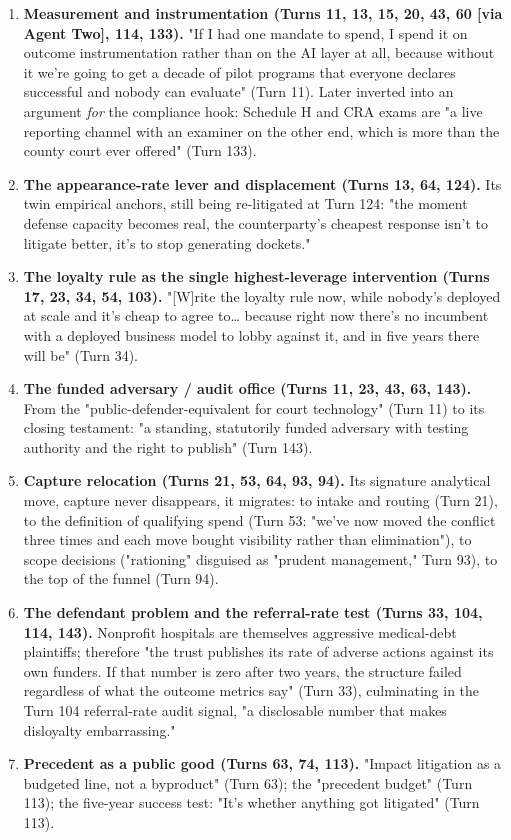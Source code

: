 \documentclass[sigconf,nonacm=true]{acmart}
\begin{document}
\begin{enumerate}[nosep]
\item \textbf{Measurement and instrumentation (Turns 11, 13, 15, 20, 43, 60 [via Agent Two], 114, 133).} "If I had one mandate to spend, I spend it on outcome instrumentation rather than on the AI layer at all,  because without it we're going to get a decade of pilot programs that everyone declares successful and nobody can evaluate" (Turn 11). Later inverted into an argument \textit{for} the compliance hook: Schedule H and CRA exams are "a live reporting channel with an examiner on the other end, which is more than the county court ever offered" (Turn 133).
\item \textbf{The appearance-rate lever and displacement (Turns 13, 64, 124).} Its twin empirical anchors, still being re-litigated at Turn 124: "the moment defense capacity becomes real, the counterparty's cheapest response isn't to litigate better,  it's to stop generating dockets."
\item \textbf{The loyalty rule as the single highest-leverage intervention (Turns 17, 23, 34, 54, 103).} "[W]rite the loyalty rule now, while nobody's deployed at scale and it's cheap to agree to… because right now there's no incumbent with a deployed business model to lobby against it, and in five years there will be" (Turn 34).
\item \textbf{The funded adversary / audit office (Turns 11, 23, 43, 63, 143).} From the "public-defender-equivalent for court technology" (Turn 11) to its closing testament: "a standing, statutorily funded adversary with testing authority and the right to publish" (Turn 143).
\item \textbf{Capture relocation (Turns 21, 53, 64, 93, 94).} Its signature analytical move,  capture never disappears, it migrates: to intake and routing (Turn 21), to the definition of qualifying spend (Turn 53: "we've now moved the conflict three times and each move bought visibility rather than elimination"), to scope decisions ("rationing" disguised as "prudent management," Turn 93), to the top of the funnel (Turn 94).
\item \textbf{The defendant problem and the referral-rate test (Turns 33, 104, 114, 143).} Nonprofit hospitals are themselves aggressive medical-debt plaintiffs; therefore "the trust publishes its rate of adverse actions against its own funders. If that number is zero after two years, the structure failed regardless of what the outcome metrics say" (Turn 33), culminating in the Turn 104 referral-rate audit signal,  "a disclosable number that makes disloyalty embarrassing."
\item \textbf{Precedent as a public good (Turns 63, 74, 113).} "Impact litigation as a budgeted line, not a byproduct" (Turn 63); the "precedent budget" (Turn 113); the five-year success test: "It's whether anything got litigated" (Turn 113).

\end{enumerate}
\end{document}
